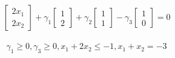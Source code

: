 \begin{align}
  \begin{bmatrix}
     2x_1 \\
     2x_2
  \end{bmatrix}
  +
  \gamma_1
  \begin{bmatrix}
    1 \\
    2
  \end{bmatrix}
  +
  \gamma_2
  \begin{bmatrix}
    1 \\
    1
  \end{bmatrix}
  -
  \gamma_3
  \begin{bmatrix}
    1 \\
    0
  \end{bmatrix}
  = 0
\end{align}

\begin{equation}
  \begin{aligned}
    \gamma_1 \geq 0, \gamma_3 \geq 0, x_1 + 2x_2 \leq -1, x_1+x_2 = -3
  \end{aligned}
\end{equation}